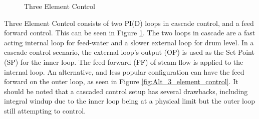         \begin{figure}[ht]
            \begin{center}
                \caption{Three Element Control \cite{crossco}}
                \label{fig:3_element_control}
            \end{center}
        \end{figure} 
        
        Three Element Control \cite{crossco} consists of two PI(D) loops in cascade control, and a feed forward control. This can be seen in Figure \ref{fig:3_element_control}. The two loops in cascade are a fast acting internal loop for feed-water and a slower external loop for drum level. In a cascade control scenario, the external loop's output (OP) is used as the Set Point (SP) for the inner loop. 
        The feed forward (FF) of steam flow is applied to the internal loop. An alternative, and less popular configuration can have the feed forward on the outer loop, as seen in Figure \ref{fig:Alt_3_element_control}. It should be noted that a cascaded control setup has several drawbacks, including integral windup due to the inner loop being at a physical limit but the outer loop still attempting to control. 

